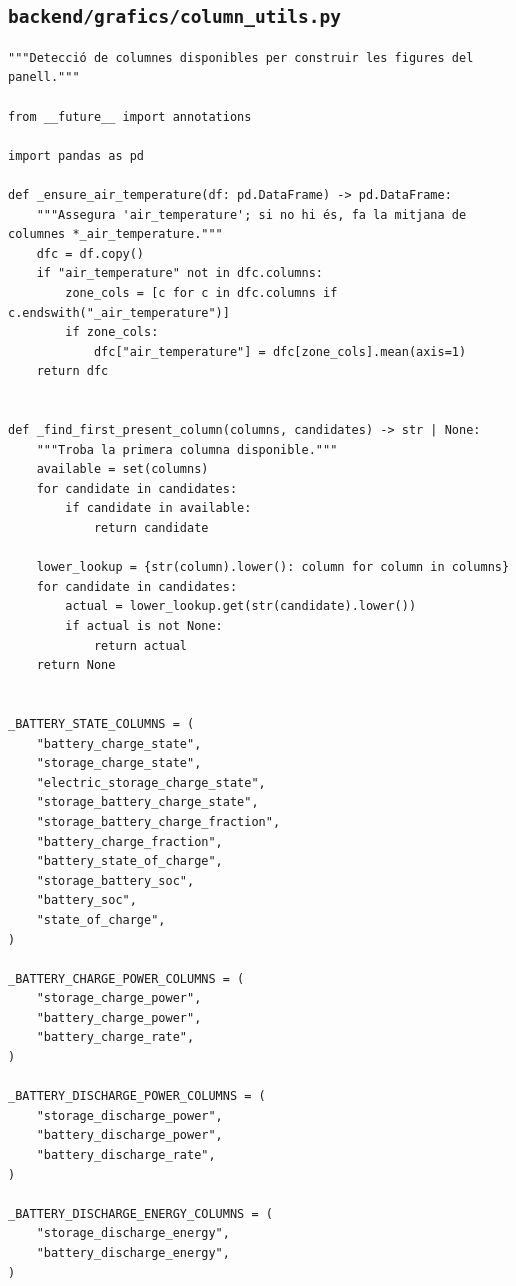 \documentclass[10pt,a4paper]{article}
\begin{document}

\subsection{\texorpdfstring{\texttt{backend/grafics/column\_utils.py}}{backend/grafics/column\_utils.py}}

\begin{lstlisting}[style=studioPython,caption={backend/grafics/column\_utils.py},label={lst:backend-grafics-column-utils-py}]
"""Detecció de columnes disponibles per construir les figures del panell."""

from __future__ import annotations

import pandas as pd

def _ensure_air_temperature(df: pd.DataFrame) -> pd.DataFrame:
    """Assegura 'air_temperature'; si no hi és, fa la mitjana de columnes *_air_temperature."""
    dfc = df.copy()
    if "air_temperature" not in dfc.columns:
        zone_cols = [c for c in dfc.columns if c.endswith("_air_temperature")]
        if zone_cols:
            dfc["air_temperature"] = dfc[zone_cols].mean(axis=1)
    return dfc


def _find_first_present_column(columns, candidates) -> str | None:
    """Troba la primera columna disponible."""
    available = set(columns)
    for candidate in candidates:
        if candidate in available:
            return candidate

    lower_lookup = {str(column).lower(): column for column in columns}
    for candidate in candidates:
        actual = lower_lookup.get(str(candidate).lower())
        if actual is not None:
            return actual
    return None


_BATTERY_STATE_COLUMNS = (
    "battery_charge_state",
    "storage_charge_state",
    "electric_storage_charge_state",
    "storage_battery_charge_state",
    "storage_battery_charge_fraction",
    "battery_charge_fraction",
    "battery_state_of_charge",
    "storage_battery_soc",
    "battery_soc",
    "state_of_charge",
)

_BATTERY_CHARGE_POWER_COLUMNS = (
    "storage_charge_power",
    "battery_charge_power",
    "battery_charge_rate",
)

_BATTERY_DISCHARGE_POWER_COLUMNS = (
    "storage_discharge_power",
    "battery_discharge_power",
    "battery_discharge_rate",
)

_BATTERY_DISCHARGE_ENERGY_COLUMNS = (
    "storage_discharge_energy",
    "battery_discharge_energy",
)


\end{lstlisting}
\end{document}
